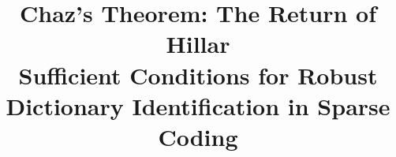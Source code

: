 \documentclass[journal,onecolumn]{IEEEtran}
\begin{document}
%
\title{Chaz's Theorem: The Return of Hillar\\ {\large Sufficient Conditions for Robust Dictionary Identification in Sparse Coding}}

%
%
%




% 
%



% 
\end{document}
